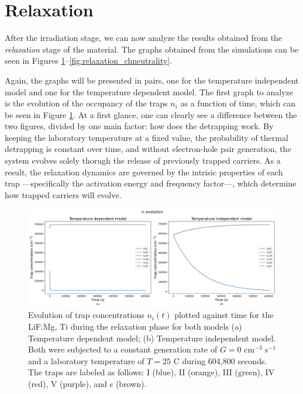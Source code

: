 \section{Relaxation}

After the irradiation stage, we can now analyze the results obtained from the \textit{relaxation} stage of the material. The graphs obtained from the simulations can be seen in Figures \ref{fig:relaxation_nievolution}--\ref{fig:relaxation_chneutrality}.

\vspace{10pt}

Again, the graphs will be presented in pairs, one for the temperature independent model and one for the temperature dependent model. The first graph to analyze is the evolution of the occupancy of the traps $n_i$ as a function of time, which can be seen in Figure \ref{fig:relaxation_nievolution}. At a first glance, one can clearly see a difference between the two figures, divided by one main factor: how does the detrapping work. By keeping the laboratory temperature at a fixed value, the probability of thermal detrapping is constant over time, and without electron-hole pair generation, the system evolves solely thorugh the release of previously trapped carriers. %
As a result, the relaxation dynamics are governed by the intrisic properties of each trap ---specifically the activation energy and frequency factor---, which determine how trapped carriers will evolve. 

\vspace{10pt}

\begin{figure}[ht]
    \centering
    \includegraphics[width=\textwidth]{Images/Relaxation n_i evolution.png}
    \caption{Evolution of trap concentrations $n_i(t)$  plotted against time for the LiF:Mg, Ti during the relaxation phase for both models (a) Temperature dependent model; (b) Temperature independent model. Both were subjected to a constant generation rate of $G = 0$ cm$^{-3}$ s$^{-1}$ and a laboratory temperature of $T = 25$ \textdegree C during 604,800 seconds. The traps are labeled as follows: I (blue), II (orange), III (green), IV (red), V (purple), and s (brown).}
    \label{fig:relaxation_nievolution}
\end{figure}

